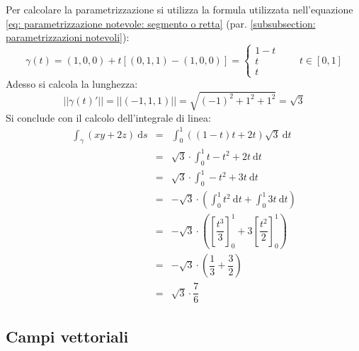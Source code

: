 \documentclass[a4paper]{article}
\begin{document}
	\noindent
	Per calcolare la parametrizzazione si utilizza la formula utilizzata nell'equazione \ref{eq: parametrizzazione notevole: segmento o retta} (par. \ref{subsubsection: parametrizzazioni notevoli}):
	\begin{equation*}
		\gamma\left(t\right) = \left(1,0,0\right) + t \left[\left(0,1,1\right) - \left(1,0,0\right)\right] = \begin{cases}
			1-t \\
			t \\
			t
		\end{cases}
		\hspace{2em}
		t \in \left[0,1\right]
	\end{equation*}
	Adesso si calcola la lunghezza:
	\begin{equation*}
		\left|\left| \gamma\left(t\right)' \right|\right| = \left|\left| \left(-1,1,1\right) \right|\right| = \sqrt{\left(-1\right)^{2} + 1^{2} + 1^{2}} = \sqrt{3}
	\end{equation*}
	Si conclude con il calcolo dell'integrale di linea:
	\begin{equation*}
		\begin{array}{rcl}
			\displaystyle\int_{\gamma} \left(xy+2z\right) \:\mathrm{d}s
			&=&
			\displaystyle\int_{0}^{1} \left(\left(1-t\right)t+2t\right)\sqrt{3} \:\mathrm{d}t \\ [1.5em]
			&=&
			\sqrt{3} \cdot \displaystyle\int_{0}^{1} t-t^{2}+2t \:\mathrm{d}t \\ [1.5em]
			&=&
			\sqrt{3} \cdot \displaystyle\int_{0}^{1} -t^{2}+3t \:\mathrm{d}t \\ [1.5em]
			&=&
			-\sqrt{3} \cdot \left(\displaystyle\int_{0}^{1} t^{2} \:\mathrm{d}t + \displaystyle\int_{0}^{1} 3t \:\mathrm{d}t\right) \\ [1.5em]
			&=&
			-\sqrt{3} \cdot \left(\left[\dfrac{t^{3}}{3}\right]_{0}^{1} + 3\left[\dfrac{t^{2}}{2}\right]_{0}^{1}\right) \\ [1.5em]
			&=&
			-\sqrt{3} \cdot \left(\dfrac{1}{3} + \dfrac{3}{2}\right) \\ [1.5em]
			&=&
			\sqrt{3} \cdot \dfrac{7}{6}
		\end{array}
	\end{equation*}\newpage

	\subsection{Campi vettoriali}
\end{document}

